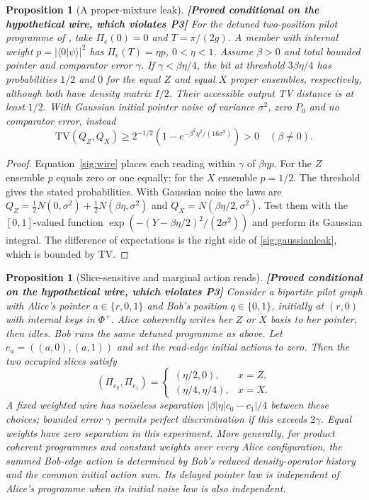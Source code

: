 \documentclass[11pt,a4paper]{article}
\newtheorem{proposition}[theorem]{Proposition}
\theoremstyle{definition}
\theoremstyle{remark}\newtheorem{remark}[theorem]{Remark}
\newcommand{\status}[1]{\textbf{[#1]}\quad}
\newcommand{\TV}{\mathrm{TV}}
\begin{document}
\begin{proposition}[A proper-mixture leak]
\label{sig:properwire}
\status{Proved conditional on the hypothetical wire, which violates P3}
For the detuned two-position pilot programme of
\cite[\texttt{acc:detunedH}, \texttt{acc:delayed}]{RM}, take
$\Pi_e(0)=0$ and $T=\pi/(2g)$. A member with internal weight
$p=|\langle0|\psi\rangle|^2$ has $\Pi_e(T)=\eta p$,
$0<\eta<1$. Assume $\beta>0$ and total bounded pointer and comparator
error $\gamma$. If $\gamma<\beta\eta/4$, the bit at threshold
$3\beta\eta/4$ has probabilities $1/2$ and $0$ for the equal $Z$ and
equal $X$ proper ensembles, respectively, although both have density
matrix $I/2$. Their accessible output TV distance is at least $1/2$.
With Gaussian initial pointer noise of variance $\sigma^2$, zero
$P_0$ and no comparator error, instead
\begin{equation}\label{sig:gaussianleak}
 \TV(Q_Z,Q_X)\ge2^{-1/2}
 \left(1-e^{-\beta^2\eta^2/(16\sigma^2)}\right)>0
 \quad(\beta\ne0).
\end{equation}
\end{proposition}
\begin{proof}
Equation~\eqref{sig:wire} places each reading within $\gamma$ of
$\beta\eta p$. For the $Z$ ensemble $p$ equals zero or one equally;
for the $X$ ensemble $p=1/2$. The threshold gives the stated
probabilities. With Gaussian noise the laws are
$Q_Z=\frac12N(0,\sigma^2)+\frac12N(\beta\eta,\sigma^2)$ and
$Q_X=N(\beta\eta/2,\sigma^2)$. Test them with the $[0,1]$-valued
function $\exp(-(Y-\beta\eta/2)^2/(2\sigma^2))$ and perform its
Gaussian integral. The difference of expectations is the right side
of \eqref{sig:gaussianleak}, which is bounded by TV.
\end{proof}

\begin{proposition}[Slice-sensitive and marginal action reads]
\label{sig:slices}
\status{Proved conditional on the hypothetical wire, which violates P3}
Consider a bipartite pilot graph with Alice's pointer $a\in\{r,0,1\}$
and Bob's position $q\in\{0,1\}$, initially at $(r,0)$ with internal
keys in $\Phi^+$. Alice coherently writes her $Z$ or $X$ basis to her
pointer, then idles. Bob runs the same detuned programme as above. Let
$e_a=((a,0),(a,1))$ and set the read-edge initial actions to zero.
Then the two occupied slices satisfy
\[
 (\Pi_{e_0},\Pi_{e_1})=
 \begin{cases}(\eta/2,0),&x=Z,\\
 (\eta/4,\eta/4),&x=X.
 \end{cases}
\]
A fixed weighted wire has noiseless separation
$|\beta|\eta|c_0-c_1|/4$ between these choices; bounded error
$\gamma$ permits perfect discrimination if this exceeds $2\gamma$.
Equal weights have zero separation in this experiment. More generally,
for product coherent programmes and constant weights over every Alice
configuration, the summed Bob-edge action is determined by Bob's
reduced density-operator history and the common initial action sum.
Its delayed pointer law is independent of Alice's programme when its
initial noise law is also independent.
\end{proposition}
\end{document}
